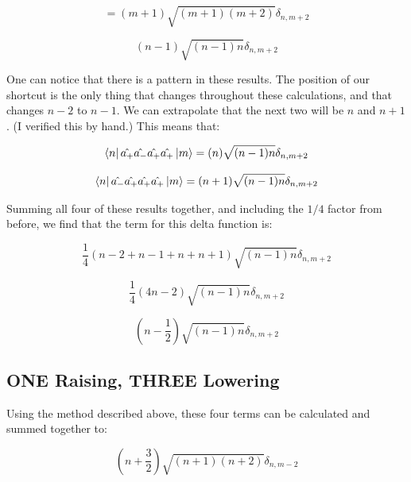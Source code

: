 \documentclass[12pt]{article}
\begin{document}
\begin{equation}
 = (m+1) \sqrt{ (m+1) (m+2) } \delta_{n, m+2}
\end{equation}

\begin{equation}
(n-1) \sqrt{ (n-1) n} \delta_{n, m+2}
\end{equation}

One can notice that there is a pattern in these results. The position of our shortcut is the only thing that changes throughout these calculations, and that changes $n-2$ to $n-1$. We can extrapolate that the next two will be $n$ and $n+1$. (I verified this by hand.) This means that:

\begin{equation}
\bra{n} \hat{a_+}\hat{a_-}\hat{a_+}\hat{a_+} \ket{m} = 
(n) \sqrt{ (n-1) n} \delta_{n, m+2}
\end{equation}

\begin{equation}
\bra{n} \hat{a_-}\hat{a_+}\hat{a_+}\hat{a_+} \ket{m} = 
(n+1) \sqrt{ (n-1) n} \delta_{n, m+2}
\end{equation}

Summing all four of these results together, and including the $1/4$ factor from before, we find that the term for this delta function is:

\begin{equation}
\frac{1}{4}( n - 2 + n - 1 + n + n + 1 ) \sqrt{ (n-1) n} \delta_{n, m+2}
\end{equation}

\begin{equation}
\frac{1}{4}(4n - 2) \sqrt{ (n-1) n} \delta_{n, m+2}
\end{equation}

\begin{equation}
\left(n - \frac{1}{2}\right) \sqrt{ (n-1) n} \delta_{n, m+2}
\end{equation}

\subsection*{ONE Raising, THREE Lowering}

Using the method described above, these four terms can be calculated and summed together to:

\begin{equation}
\left( n + \frac{3}{2} \right) \sqrt{ (n+1) (n+2) } \delta_{n, m-2}
\end{equation}
\end{document}
